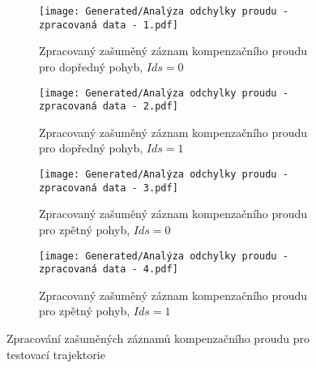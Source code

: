 \begin{landscapeimagepage}
    \begin{figure}[H]
        \centering
        \begin{subfigure}{.5\textheight}
            \centering
            \texttt{[image: Generated/Analýza odchylky proudu - zpracovaná data - 1.pdf]}
            \caption{Zpracovaný zašuměný záznam kompenzačního proudu pro dopředný pohyb, $Ids = 0$}
            \label{fig: Zpracovaný zašuměný záznam kompenzačního proudu pro dopředný pohyb, Ids = 0 m}
        \end{subfigure}
        \vspace{0.5cm}
        \hspace{2.5cm}
        \begin{subfigure}{.5\textheight}
            \centering
            \texttt{[image: Generated/Analýza odchylky proudu - zpracovaná data - 2.pdf]}
            \caption{Zpracovaný zašuměný záznam kompenzačního proudu pro dopředný pohyb, $Ids = 1$}
            \label{fig: Zpracovaný zašuměný záznam kompenzačního proudu pro dopředný pohyb, Ids = 1 m}
        \end{subfigure}
        \vspace{0.5cm}
        \begin{subfigure}{.5\textheight}
            \centering
            \texttt{[image: Generated/Analýza odchylky proudu - zpracovaná data - 3.pdf]}
            \caption{Zpracovaný zašuměný záznam kompenzačního proudu pro zpětný pohyb, $Ids = 0$}
            \label{fig: Zpracovaný zašuměný záznam kompenzačního proudu pro zpětný pohyb, Ids = 0 m}
        \end{subfigure}
        \hspace{2.5cm}
        \begin{subfigure}{.5\textheight}
            \centering
            \texttt{[image: Generated/Analýza odchylky proudu - zpracovaná data - 4.pdf]}
            \caption{Zpracovaný zašuměný záznam kompenzačního proudu pro zpětný pohyb, $Ids = 1$}
            \label{fig: Zpracovaný zašuměný záznam kompenzačního proudu pro zpětný pohyb, Ids = 1 m}
        \end{subfigure}
        \caption{Zpracování zašuměných záznamů kompenzačního proudu pro testovací trajektorie}
        \label{}
    \end{figure}
\end{landscapeimagepage}


